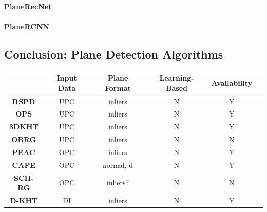 \documentclass[main.tex]{subfiles}
\begin{document}
\paragraph{PlaneRecNet}
\paragraph{PlaneRCNN}


\subsection{Conclusion: Plane Detection Algorithms}
\begin{table}[H]
    \centering
    \begin{tabular}{|c|c|c|c|c|c}
        \hline
                                                                         & \textbf{Input Data} & \textbf{Plane Format} & \textbf{Learning-Based} & \textbf{Availability} \\ \hline
        \textbf{RSPD} \cite{Araújo_Oliveira_2020}                        & UPC                 & inliers               & N                       & Y                     \\ \hline
        \textbf{OPS} \cite{Sun_Mordohai_2019}                            & UPC                 & inliers               & N                       & Y                     \\ \hline
        \textbf{3DKHT} \cite{Limberger_Oliveira_2015}                    & UPC                 & inliers               & N                       & Y                     \\ \hline
        \textbf{OBRG} \cite{Vo_Truong-Hong_Laefer_Bertolotto_2015}       & UPC                 & inliers               & N                       & N                     \\ \hline
        \textbf{PEAC} \cite{Feng_Taguchi_Kamat_2014}                     & OPC                 & inliers               & N                       & Y                     \\ \hline
        \textbf{CAPE} \cite{Proença_Gao_2018}                            & OPC                 & normal, d             & N                       & Y                     \\ \hline
        \textbf{SCH-RG} \cite{Mols_Li_Hanebeck_2020}                     & OPC                 & inliers?              & N                       & N                     \\ \hline
        \textbf{D-KHT}  \cite{Vera_Lucio_Fernandes_Velho_2018}           & DI                  & inliers               & N                       & Y                     \\ \hline

\end{tabular}
\end{table}
\end{document}
